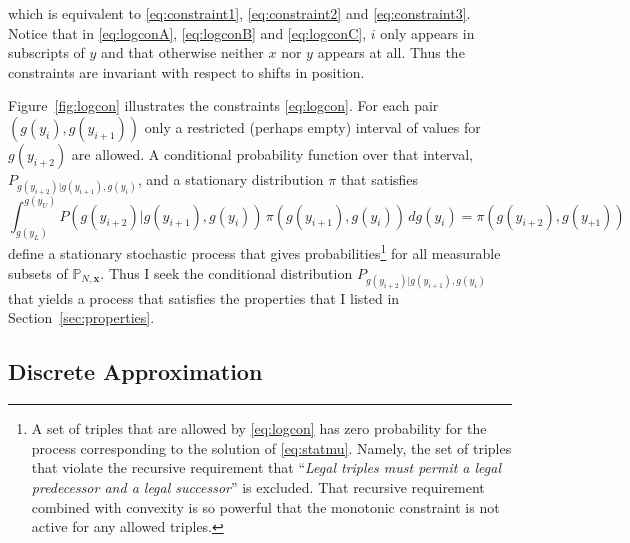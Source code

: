\documentclass[]{article}
\newcommand{\field}[1]{\mathbb{#1}}
\newcommand\Polytope[1]{\field{P}_{#1}}
\newcommand\PolytopeN{\Polytope{N,\mathbf{x}}}
\newcommand\logx{y}
\newcommand\logf{g}
\begin{document}
which is equivalent to \eqref{eq:constraint1}, \eqref{eq:constraint2}
and \eqref{eq:constraint3}.  Notice that in \eqref{eq:logconA},
\eqref{eq:logconB} and \eqref{eq:logconC}, $i$ only appears in
subscripts of $\logx$ and that otherwise neither $x$ nor $\logx$
appears at all.  Thus the constraints are invariant with respect to
shifts in position.

\newcommand{\stationary}{\pi}%
Figure~\ref{fig:logcon} illustrates the constraints \eqref{eq:logcon}.
For each pair $(\logf(\logx_{i}), \logf(\logx_{i+1}))$ only a
restricted (perhaps empty) interval of values for $\logf(\logx_{i+2})$
are allowed.  A conditional probability function over that interval,
$P_{\logf(\logx_{i+2})|\logf(\logx_{i+1}),\logf(\logx_{i})}$, and a
stationary distribution $\stationary$ that satisfies
\begin{equation}
  \label{eq:statmu}
  \int_{\logf(\logx_{L})}^{\logf(\logx_{U})}
  P(\logf(\logx_{i+2})|\logf(\logx_{i+1}),\logf(\logx_{i}))\,
  \stationary(\logf(\logx_{i+1}),\logf(\logx_{i}))\, d \logf(\logx_{i})
  = \stationary(\logf(\logx_{i+2}),\logf(\logx_{+1}))
\end{equation}
define a stationary stochastic process that gives
probabilities\footnote{A set of triples that are allowed by
  \eqref{eq:logcon} has zero probability for the process corresponding
  to the solution of \eqref{eq:statmu}.  Namely, the set of triples
  that violate the recursive requirement that ``\emph{Legal triples
    must permit a legal predecessor and a legal successor}'' is
  excluded.  That recursive requirement combined with convexity is so
  powerful that the monotonic constraint is not active for any allowed
  triples.} for all measurable subsets of $\PolytopeN$.  Thus I seek
the conditional distribution
$P_{\logf(\logx_{i+2})|\logf(\logx_{i+1}), \logf(\logx_{i})}$ that
yields a process that satisfies the properties that I listed in
Section~\ref{sec:properties}.

\begin{figure*}
  \centering
    \caption{Upper and lower bounds of the allowed region in
      $g(y_{i+2})$ given $(g(y_i), g(y_{i+1}))$.  For this figure, the
      spacing in $y$ yields 600 samples and the spacing in $g$ yields
      50 samples. }
  \label{fig:logcon}
\end{figure*}

\subsection{Discrete Approximation}
\label{sec:discrete}
\end{document}

